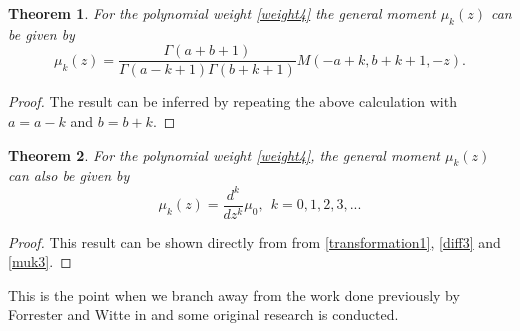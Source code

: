 \documentclass[12pt]{article}
\newtheorem{mydef}{Theorem}[section]
\numberwithin{figure}{section}
\numberwithin{equation}{section}
\numberwithin{table}{section}
\begin{document}
\begin{mydef}
For the  polynomial weight \eqref{weight4} the general moment $\mu_k(z)$ can be given by
\begin{equation}\label{muk3}
\mu_k(z)=\frac{\Gamma( a+ b+1)}{\Gamma( a-k+1)\Gamma( b+k+1)} M(- a+k, b+k+1,-z).
\end{equation}
\end{mydef}
\begin{proof}
The result can be inferred by repeating the above calculation with $ a= a-k$ and $ b= b+k$.
\end{proof}
\begin{mydef}
For the polynomial weight \eqref{weight4}, the  general moment $\mu_k(z)$ can also be given by
\begin{equation}\nonumber
\mu_k(z)=\frac{d^{k}}{dz^{k}}\mu_{0},~~k=0,1,2,3,...
\end{equation}
\end{mydef}
\begin{proof}
This result can be shown directly from from \eqref{transformation1}, \eqref{diff3} and \eqref{muk3}.
\end{proof}
This is the point when we branch away from the work done previously by Forrester and Witte in \cite{2004:159,Witte} and some original research is conducted.
\end{document}
